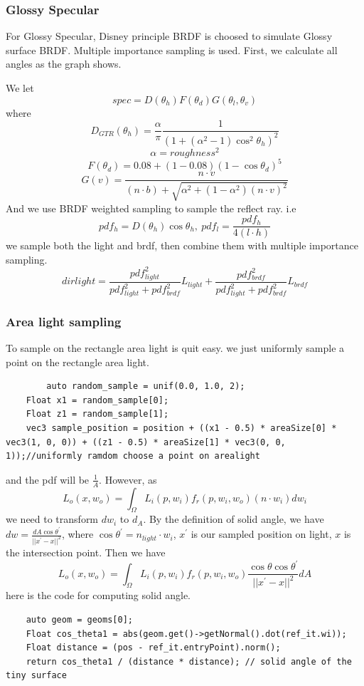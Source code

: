 \documentclass[acmtog]{acmart}
\begin{document}
\subsubsection{Glossy Specular}
	\quad For Glossy Specular, Disney principle BRDF is choosed to simulate Glossy surface BRDF. Multiple importance sampling is used.
	First, we calculate all angles as the graph shows.
	\begin{figure}[H]
		\centering
		
	\end{figure}
	We let $$spec = D(\theta_h)F(\theta_d)G(\theta_l,\theta_v)$$
	where $$D_{GTR}(\theta_h) = \frac{\alpha}{\pi}\frac{1}{(1 + (\alpha^2-1)\cos^2\theta_h)^2}$$ $$\alpha = roughness^2$$
	$$F(\theta_d) = 0.08 + (1- 0.08)(1-\cos \theta_d)^5$$
	$$G(v) = \frac{n \cdot v}{(n \cdot b) + \sqrt{\alpha^2 + (1-\alpha^2)(n \cdot v)^2}}$$
	And we use BRDF weighted sampling to sample the reflect ray. i.e
	$$pdf_h = D(\theta_h)\cos\theta_h, \ pdf_l = \frac{pdf_h}{4(l \cdot h)}$$
	we sample both the light and brdf, then combine them with multiple importance sampling.
	$$dirlight = \frac{pdf_{light}^2}{pdf_{light}^2 + pdf_{brdf}^2}L_{light} + \frac{pdf_{brdf}^2}{pdf_{light}^2 + pdf_{brdf}^2}L_{brdf}$$
	\subsubsection{Area light sampling}
	To sample on the rectangle area light is quit easy. we just uniformly sample a point on the rectangle area light.
	\begin{lstlisting}
		auto random_sample = unif(0.0, 1.0, 2);
    Float x1 = random_sample[0];
    Float z1 = random_sample[1];
    vec3 sample_position = position + ((x1 - 0.5) * areaSize[0] * vec3(1, 0, 0)) + ((z1 - 0.5) * areaSize[1] * vec3(0, 0, 1));//uniformly ramdom choose a point on arealight
	\end{lstlisting}
	and the pdf will be $\frac{1}{A}$.
	However, as $$L_o(x,w_o) = \int_{\Omega}L_i(p,w_i)f_r(p,w_i,w_o)(n\cdot w_i)dw_i$$
	we need to transform $dw_i$ to $d_A$. By the definition of solid angle, we have $dw = \frac{dA \cos\theta^{'}}{||x^{'} - x||^2}$, where 
	$\cos\theta^{'} = n_{light} \cdot w_i$, $x^{'}$ is our sampled position on light, $x$ is the intersection point. Then we have
	$$L_o(x,w_o) = \int_{\Omega}L_i(p,w_i)f_r(p,w_i,w_o)\frac{\cos\theta\cos\theta^{'}}{||x^{'} - x||^2}dA$$
	here is the code for computing solid angle.
	\begin{lstlisting}
	auto geom = geoms[0];
    Float cos_theta1 = abs(geom.get()->getNormal().dot(ref_it.wi));
    Float distance = (pos - ref_it.entryPoint).norm();
    return cos_theta1 / (distance * distance); // solid angle of the tiny surface
	\end{lstlisting}
\end{document}

